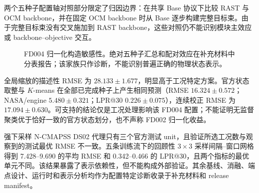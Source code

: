 两个五种子配置轴对照部分限定了归因边界：在共享 Base 协议下比较 RAST 与 OCM backbone，并在固定 OCM backbone 时从 Base 逐步构建完整目标束。由于完整目标束没有交叉施加到 RAST backbone，这些对照仍不能识别模块主效应或 backbone--objective 交互。

\begin{figure}[!t]
\centering
{}
\caption{FD004 归一化构造敏感性。绝对五种子汇总和配对效应在补充材料中分表报告；该家族只作诊断，不能识别普遍正确的物理状态表示。}
\label{fig:condition-normalization-controls-zh}
\end{figure}

全局缩放的描述性 RMSE 为 $28.133\pm1.677$，明显高于工况特定方案。官方状态取整与 $K$-means 在全部已完成种子上产生相同预测（RMSE $16.324\pm0.572$；NASA/engine $5.480\pm0.321$；LPR@30 $0.226\pm0.075$），连续校正 RMSE 为 $17.094\pm0.630$。可支持的结论仅是工况处理影响该 FD004 配置；不能证明无监督聚类优于恰好一致的官方状态划分，也不声称 FD002 归一化收益。

强下采样 N-CMAPSS DS02 代理只有三个官方测试 unit，且验证所选工况数与观察到的测试最优 RMSE 不一致。五条训练流下的回顾性 $3\times3$ 采样间隔--窗口网格得到 7.428--9.690 的平均 RMSE 和 0.342--0.466 的 LPR@30，且两个指标的最优单元不同。该结果暴露了表示依赖性，但不能构成外部验证。其余基线、消融、端点设计、运行时和表示分析均作为配置特定诊断收录于补充材料和 release manifest。
\FloatBarrier
